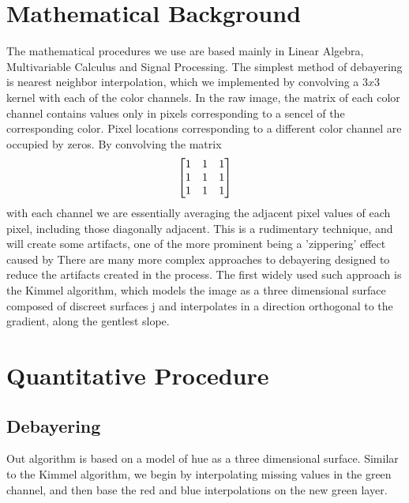 \documentclass{article}\twocolumn
\begin{document}
\section{Mathematical Background}
The mathematical procedures we use are based mainly in Linear Algebra, Multivariable Calculus and Signal Processing. The simplest method of debayering is nearest neighbor interpolation, which we implemented by convolving a  $3x3$ kernel with each of the color channels. In the raw image, the matrix of each color channel contains values only in pixels corresponding to a sencel of the corresponding color. Pixel locations corresponding to a different color channel are occupied by zeros. By convolving the matrix 
    \begin{align}
        \begin{bmatrix} 1 & 1 & 1 \\ 1 & 1 & 1 \\ 1 & 1 & 1 \end{bmatrix}
    \end{align}
with each channel we are essentially averaging the adjacent pixel values of each pixel, including those diagonally adjacent. This is a rudimentary technique, and will create some artifacts, one of the more prominent being a 'zippering' effect caused by %
There are many more complex approaches to debayering designed to reduce the artifacts created in the process. The first widely used such approach is the Kimmel algorithm, which models the image as a three dimensional surface composed of discreet surfaces j and interpolates in a direction orthogonal to the gradient, along the gentlest slope.

\section{Quantitative Procedure}

\subsection{Debayering}
    Out algorithm is based on a model of hue as a three dimensional surface. Similar to the Kimmel algorithm, we begin by interpolating missing values in the green channel, and then base the red and blue interpolations on the new green layer. 
    
    
    
\end{document}
